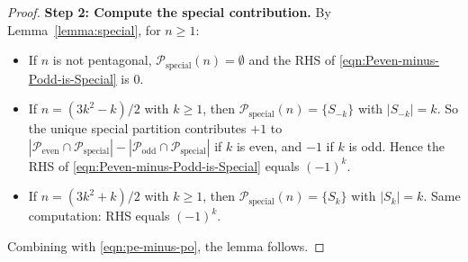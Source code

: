 \begin{proof}
\textbf{Step 2: Compute the special contribution.} By Lemma~\ref{lemma:special}, for $n \geq 1$:
\begin{itemize}
\item If $n$ is not pentagonal, $\mathcal{P}_{\mathrm{special}}(n) = \emptyset$ and the RHS of \eqref{eqn:Peven-minus-Podd-is-Special} is $0$.
\item If $n = (3k^2 - k)/2$ with $k \geq 1$, then $\mathcal{P}_{\mathrm{special}}(n) = \{S_{-k}\}$ with $|S_{-k}| = k$. So the unique special partition contributes $+1$ to $|\mathcal{P}_{\mathrm{even}} \cap \mathcal{P}_{\mathrm{special}}| - |\mathcal{P}_{\mathrm{odd}} \cap \mathcal{P}_{\mathrm{special}}|$ if $k$ is even, and $-1$ if $k$ is odd. Hence the RHS of \eqref{eqn:Peven-minus-Podd-is-Special} equals $(-1)^k$.
\item If $n = (3k^2 + k)/2$ with $k \geq 1$, then $\mathcal{P}_{\mathrm{special}}(n) = \{S_{k}\}$ with $|S_{k}| = k$. Same computation: RHS equals $(-1)^k$.
\end{itemize}

Combining with \eqref{eqn:pe-minus-po}, the lemma follows.
\end{proof}

